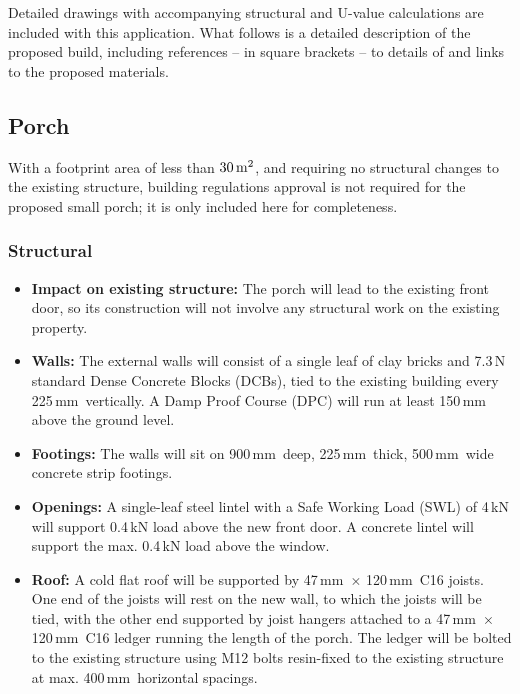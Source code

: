 \documentclass{extension}
\newcommand{\mm}{\,$\mathrm{mm}$}
\begin{document}
Detailed drawings with accompanying structural and U-value calculations are included with this application. What follows is a detailed description of the proposed build, including references -- in square brackets -- to details of and links to the proposed materials.

\subsection{Porch}
\label{porch}
With a footprint area of less than $30\,{\rm m^2}$, and requiring no structural changes to the existing structure, building regulations approval is not required for the proposed small porch; it is only included here for completeness.
\subsubsection{Structural}
\begin{itemize}
  \item {\bf Impact on existing structure:} The porch will lead to the existing front door, so its construction will not involve any structural work on the existing property.
  \item {\bf Walls:} The external walls will consist of a single leaf of clay bricks and 7.3\,N standard Dense Concrete Blocks (DCBs), tied to the existing building every 225\mm\ vertically. A Damp Proof Course (DPC) will run at least 150\,mm above the ground level.
  \item{\bf Footings:} The walls will sit on 900\mm\ deep, 225\mm\ thick, 500\mm\ wide concrete strip footings.
  \item {\bf Openings:} A single-leaf steel lintel with a Safe Working Load (SWL) of 4\,kN\cite{psteel} will support 0.4\,kN load above the new front door. A concrete lintel\cite{pconc} will support the max. 0.4\,kN load above the window.
  \item {\bf Roof:} A cold flat roof will be supported by 47\mm\ $\times$ 120\mm\ C16 joists. One end of the joists will rest on the new wall, to which the joists will be tied, with the other end supported by joist hangers attached to a 47\mm\ $\times$ 120\mm\ C16 ledger running the length of the porch. The ledger will be bolted to the existing structure using M12 bolts resin-fixed to the existing structure at max. 400\mm\ horizontal spacings.
\end{itemize}
\end{document}
